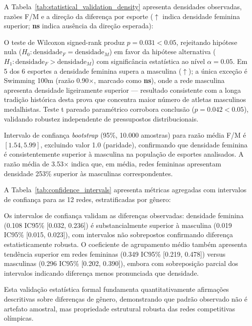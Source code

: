 A Tabela~\ref{tab:statistical_validation_density} apresenta densidades observadas, razões F/M e a direção da diferença por esporte ($\uparrow$ indica densidade feminina superior; \textbf{ns} indica ausência da direção esperada):



O teste de Wilcoxon signed-rank produz $p = 0.031 < 0.05$, rejeitando hipótese nula ($H_0: \text{densidade}_F = \text{densidade}_M$) em favor da hipótese alternativa ($H_1: \text{densidade}_F > \text{densidade}_M$) com significância estatística ao nível $\alpha = 0.05$. Em 5 dos 6 esportes a densidade feminina supera a masculina ($\uparrow$); a única exceção é Swimming 100m (razão 0.90×, marcado como \textbf{ns}), onde a rede masculina apresenta densidade ligeiramente superior --- resultado consistente com a longa tradição histórica desta prova que concentra maior número de atletas masculinos medalhistas. Teste t pareado paramétrico corrobora conclusão ($p = 0.042 < 0.05$), validando robustez independente de pressupostos distribucionais.

Intervalo de confiança \textit{bootstrap} (95\%, 10.000 amostras) \cite{VanderPlas2016Python} para razão média F/M é $[1.54, 5.99]$, excluindo valor 1.0 (paridade), confirmando que densidade feminina é consistentemente superior à masculina na população de esportes analisados. A razão média de 3.53× indica que, em média, redes femininas apresentam densidade 253\% superior às masculinas correspondentes.

A Tabela~\ref{tab:confidence_intervals} apresenta métricas agregadas com intervalos de confiança para as 12 redes, estratificadas por gênero:



Os intervalos de confiança validam as diferenças observadas: densidade feminina (0.108 IC95\% [0.032, 0.236]) é substancialmente superior à masculina (0.019 IC95\% [0.015, 0.023]), com intervalos não sobrepostos confirmando diferença estatisticamente robusta. O coeficiente de agrupamento médio também apresenta tendência superior em redes femininas (0.349 IC95\% [0.219, 0.478]) versus masculinas (0.296 IC95\% [0.202, 0.390]), embora com sobreposição parcial dos intervalos indicando diferença menos pronunciada que densidade.

Esta validação estatística formal fundamenta quantitativamente afirmações descritivas sobre diferenças de gênero, demonstrando que padrão observado não é artefato amostral, mas propriedade estrutural robusta das redes competitivas olímpicas.

